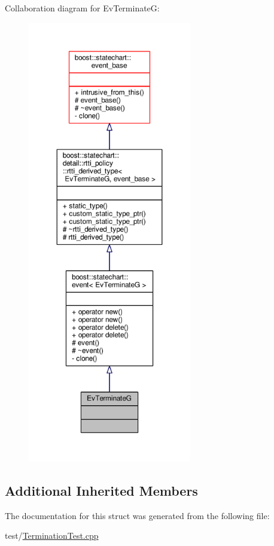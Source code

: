 Collaboration diagram for Ev\+TerminateG\+:
\nopagebreak
\begin{figure}[H]
\begin{center}
\leavevmode
\includegraphics[height=550pt]{struct_ev_terminate_g__coll__graph}
\end{center}
\end{figure}
\subsection*{Additional Inherited Members}


The documentation for this struct was generated from the following file\+:\begin{DoxyCompactItemize}
\item 
test/\mbox{\hyperlink{_termination_test_8cpp}{Termination\+Test.\+cpp}}\end{DoxyCompactItemize}
